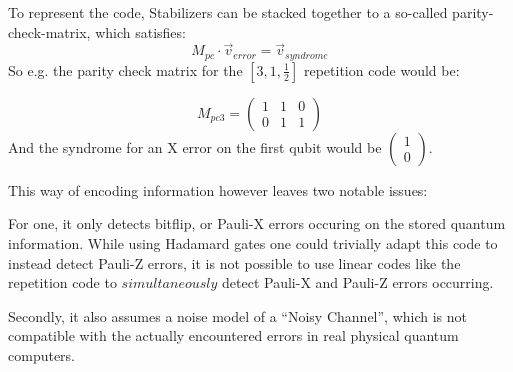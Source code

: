 To represent the code, Stabilizers can be stacked together to
a so-called parity-check-matrix, which satisfies:
\begin{equation}
	M_{pc}\cdot \vec{v}_{error} = \vec{v}_{syndrome}
\end{equation}
So e.g. the parity check matrix for the $[3,1,\frac{1}{2}]$
repetition code would be:

\begin{equation}
	M_{pc3} = \left( 
	\begin{array}{ccc}
		1 & 1 & 0 \\
		0 & 1 & 1
	\end{array}
	\right)
\end{equation}
And the syndrome for an X error on the first qubit would be
$\left(\begin{array}{c}1\\0\end{array}\right)$.

This way of encoding information however leaves two notable
issues:

For one, it only detects bitflip, or Pauli-X errors occuring on
the stored quantum information. While using Hadamard gates one
could trivially adapt this code to instead detect Pauli-Z errors,
it is not possible to use linear codes like the repetition code
to $simultaneously$ detect Pauli-X and Pauli-Z errors occurring.

Secondly, it also assumes a noise model of a ``Noisy Channel'',
which is not compatible with the actually encountered errors in
real physical quantum computers.